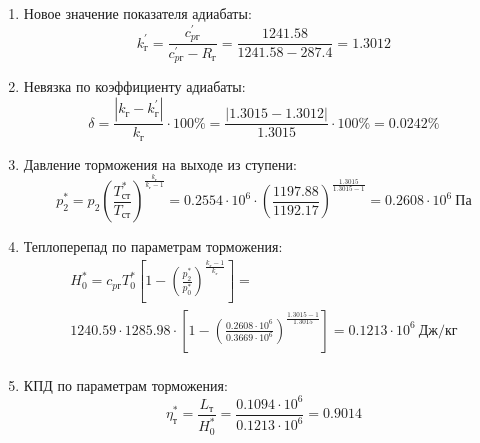 \documentclass[a4paper,10pt]{article}
\begin{document}
\begin{enumerate}
        \item Новое значение показателя адиабаты:
        \[
            k_г^\prime = \frac{c_{pг}^\prime}{c_{pг}^\prime - R_г} =
                \frac{
                    1241.58
                }{
                    1241.58 - 287.4
                }
            = 1.3012
        \]

        \item Невязка по коэффициенту адиабаты:
        \[
            \delta = \frac{ \left| k_г - k_г^\prime \right| }{ k_г } \cdot 100 \%=
                \frac{
                    \left| 1.3015 - 1.3012 \right|
                }{
                    1.3015
                } \cdot 100 \% =
            0.0242 \%
        \]

        \item Давление торможения на выходе из ступени:
        \[
            p_2^* = p_2 \left(
                            \frac{ T_{ст}^* }{ T_{ст} }
                    \right) ^ \frac{ k_г }{ k_г - 1 } =
                 0.2554 \cdot 10^6 \cdot \left(
                            \frac{ 1197.88 }{ 1192.17 }
                    \right) ^
                \frac{ 1.3015 }{ 1.3015 - 1 } =
            0.2608 \cdot 10^6 \ Па
        \]

        \item Теплоперепад по параметрам торможения:
        \begin{gather*}
            H_0^* = c_{pг} T_0^* \left[
                        1 - \left(
                                \frac{p_2^*}{p_0^*}
                            \right) ^
                        \frac{k_г - 1}{k_г}
                    \right] =\\
            1240.59 \cdot 1285.98 \cdot
                    \left[
                        1 - \left(
                                \frac{
                                    0.2608 \cdot 10^6
                                }{
                                    0.3669 \cdot 10^6
                                }
                            \right) ^
                        \frac{1.3015 - 1}{1.3015}
                    \right]
            = 0.1213 \cdot 10^6 \ Дж/кг\\
        \end{gather*}

        \item КПД по параметрам торможения:
        \[
            \eta_т^* = \frac{ L_т }{ H_0^* } =
                \frac{
                    0.1094 \cdot 10^6
                }{
                    0.1213 \cdot 10^6 } =
            0.9014
        \]


\end{enumerate}
\end{document}
